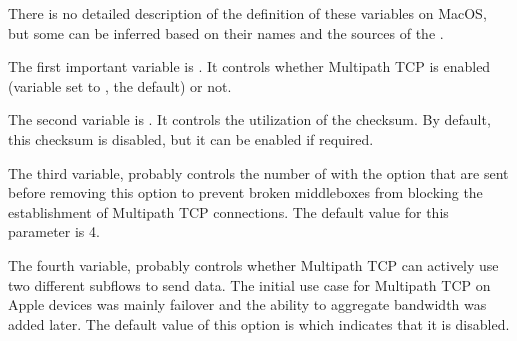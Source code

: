 \documentclass[letterpaper,10pt,english]{sphinxmanual}
\begin{document}
\begin{sphinxVerbatim}[commandchars=\\\{\}]
\end{sphinxVerbatim}

\sphinxAtStartPar
There is no detailed description of the definition of these 
variables on MacOS, but some can be inferred based on their names and the
sources of the  .

\sphinxAtStartPar
The first important  variable is . It controls whether Multipath TCP is enabled (variable set to , the default) or not.

\sphinxAtStartPar
The second  variable is . It controls the utilization of the  checksum. By default, this checksum is disabled, but it can be enabled if required.

\sphinxAtStartPar
The third  variable,   probably controls the number of  with the  option that are sent before removing this option to prevent broken middleboxes from blocking the establishment of Multipath TCP connections. The default value for this parameter is 4.

\sphinxAtStartPar
The fourth  variable,  probably controls whether Multipath TCP can actively use two different subflows to send data. The initial use case for Multipath TCP on Apple devices was mainly failover and the ability to aggregate bandwidth was added later. The default value of this option is  which indicates that it is disabled.
\end{document}
